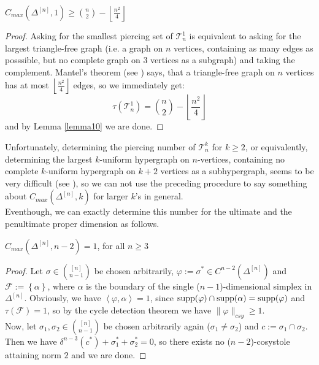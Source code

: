 \begin{thm}\label{theorem10}
\(C_{max}(\Delta^{[n]},1)\geq\binom{n}{2}-\left\lfloor\frac{n^2}{4}\right\rfloor\)
\begin{proof}
Asking for the smallest piercing set of \(\mathcal{T}_n^1\) is equivalent to asking for the largest triangle-free graph (i.e. a graph on \(n\) vertices, containing as many edges as posssible, but no complete graph on \(3\) vertices as a subgraph) and taking the complement. Mantel's theorem (see \cite{7}) says, that a triangle-free graph on \(n\) vertices has at most \(\left\lfloor\frac{n^2}{4}\right\rfloor\) edges, so we immediately get:
\[
\tau(\mathcal{T}_n^1)=\binom{n}{2}-\left\lfloor\frac{n^2}{4}\right\rfloor
\]
and by Lemma \ref{lemma10} we are done.
\end{proof}
\end{thm}

Unfortunately, determining the piercing number of \(\mathcal{T}_n^k\) for \(k\geq 2\), or equivalently, determining the largest \(k\)-uniform hypergraph on \(n\)-vertices, containing no complete \(k\)-uniform hypergraph on \(k+2\) vertices as a subhypergraph, seems to be very difficult (see \cite{7}), so we can not use the preceding procedure to say something about \(C_{max}(\Delta^{[n]},k)\) for larger \(k\)'s in general.\\
Eventhough, we can exactly determine this number for the ultimate and the penultimate proper dimension as follows.

\begin{thm}\label{theorem7}
\(C_{max}(\Delta^{[n]},n-2)=1\), for all \(n\geq 3\)
\begin{proof}
Let \(\sigma\in\binom{[n]}{n-1}\) be chosen arbitrarily, \(\varphi:=\sigma^*\in C^{n-2}(\Delta^{[n]})\) and\\
\(\mathcal{F}:=\left\{\alpha\right\}\), where \(\alpha\) is the boundary of the single (\(n-1\))-dimensional simplex in \(\Delta^{[n]}\). Obviously, we have \(\left\langle\varphi,\alpha\right\rangle=1\), since \(\mathrm{supp}(\varphi)\cap \mathrm{supp}(\alpha)=\mathrm{supp}(\varphi)\) and \(\tau(\mathcal{F})=1\), so by the cycle detection theorem we have \(\|\varphi\|_{csy}\geq 1\).\\
Now, let \(\sigma_1,\sigma_2\in\binom{[n]}{n-1}\) be chosen arbitrarily again (\(\sigma_1\neq\sigma_2\)) and \(c:=\sigma_1\cap\sigma_2\). Then we have \(\delta^{n-3}(c^*)+\sigma_1^*+\sigma_2^*=0\), so there exists no (\(n-2\))-cosystole attaining norm \(2\) and we are done.
\end{proof}
\end{thm}

